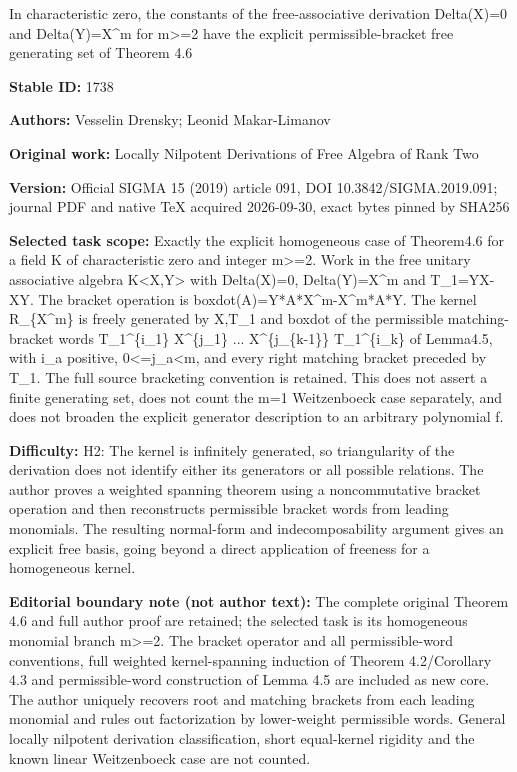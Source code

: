 \documentclass[11pt]{article}
\numberwithin{equation}{section}
\begin{document}
\begin{center}\Large In characteristic zero, the constants of the free-associative derivation Delta(X)=0 and Delta(Y)=X\textasciicircum{}m for m>=2 have the explicit permissible-bracket free generating set of Theorem 4.6\end{center}
\noindent\textbf{Stable ID:} 1738\par
\noindent\textbf{Authors:} Vesselin Drensky; Leonid Makar-Limanov\par
\noindent\textbf{Original work:} Locally Nilpotent Derivations of Free Algebra of Rank Two\par
\noindent\textbf{Version:} Official SIGMA 15 (2019) article 091, DOI 10.3842/SIGMA.2019.091; journal PDF and native TeX acquired 2026-09-30, exact bytes pinned by SHA256\par
\noindent\textbf{Selected task scope:} Exactly the explicit homogeneous case of Theorem4.6 for a field K of characteristic zero and integer m>=2. Work in the free unitary associative algebra K<X,Y> with Delta(X)=0, Delta(Y)=X\textasciicircum{}m and T\_1=YX-XY. The bracket operation is boxdot(A)=Y*A*X\textasciicircum{}m-X\textasciicircum{}m*A*Y. The kernel R\_\{X\textasciicircum{}m\} is freely generated by X,T\_1 and boxdot of the permissible matching-bracket words T\_1\textasciicircum{}\{i\_1\} X\textasciicircum{}\{j\_1\} ... X\textasciicircum{}\{j\_\{k-1\}\} T\_1\textasciicircum{}\{i\_k\} of Lemma4.5, with i\_a positive, 0<=j\_a<m, and every right matching bracket preceded by T\_1. The full source bracketing convention is retained. This does not assert a finite generating set, does not count the m=1 Weitzenboeck case separately, and does not broaden the explicit generator description to an arbitrary polynomial f.\par
\noindent\textbf{Difficulty:} H2: The kernel is infinitely generated, so triangularity of the derivation does not identify either its generators or all possible relations. The author proves a weighted spanning theorem using a noncommutative bracket operation and then reconstructs permissible bracket words from leading monomials. The resulting normal-form and indecomposability argument gives an explicit free basis, going beyond a direct application of freeness for a homogeneous kernel.\par
\noindent\textbf{Editorial boundary note (not author text):} The complete original Theorem 4.6 and full author proof are retained; the selected task is its homogeneous monomial branch m>=2. The bracket operator and all permissible-word conventions, full weighted kernel-spanning induction of Theorem 4.2/Corollary 4.3 and permissible-word construction of Lemma 4.5 are included as new core. The author uniquely recovers root and matching brackets from each leading monomial and rules out factorization by lower-weight permissible words. General locally nilpotent derivation classification, short equal-kernel rigidity and the known linear Weitzenboeck case are not counted.\par
\end{document}
